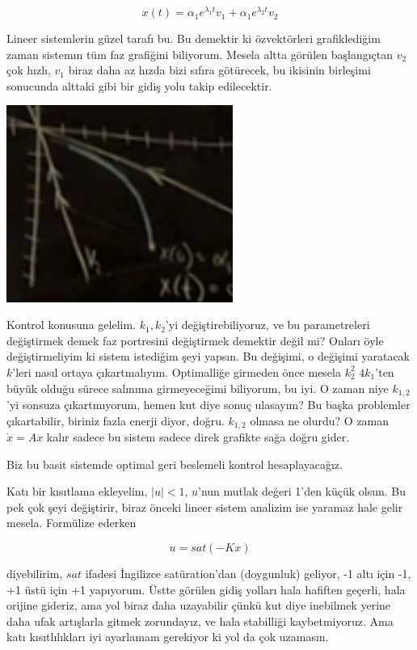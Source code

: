 \documentclass[12pt,fleqn]{article}\usepackage{../../common}
\begin{document}
$$ 
x(t) = \alpha_1 e^{\lambda_1 t}v_1  + \alpha_1 e^{\lambda_2 t} v_2
$$

Lineer sistemlerin güzel tarafı bu. Bu demektir ki özvektörleri
grafiklediğim zaman sistemın tüm faz grafiğini biliyorum. Mesela altta
görülen başlangıçtan $v_2$ çok hızlı, $v_1$ biraz daha az hızda bizi sıfıra
götürecek, bu ikisinin birleşimi sonucunda alttaki gibi bir gidiş yolu
takip edilecektir.

\includegraphics[width=20em]{phy_control_03.png}

Kontrol konusuna gelelim. $k_1,k_2$'yi değiştirebiliyoruz, ve bu
parametreleri değiştirmek demek faz portresini değiştirmek demektir değil
mi? Onları öyle değiştirmeliyim ki sistem istediğim şeyi yapsın. Bu
değişimi, o değişimi yaratacak $k$'leri nasıl ortaya
çıkartmalıyım. Optimalliğe girmeden önce mesela $k_2^2$ $4k_1$'ten büyük
olduğu sürece salınıma girmeyeceğimi biliyorum, bu iyi. O zaman niye
$k_{1,2}$'yi sonsuza çıkartmıyorum, hemen kut diye sonuç ulasayım? Bu başka
problemler çıkartabilir, biriniz fazla enerji diyor, doğru. $k_{1,2}$
olmasa ne olurdu? O zaman $\dot{x} = Ax$ kalır sadece bu sistem sadece
direk grafikte sağa doğru gider. 

Biz bu basit sistemde optimal geri beslemeli kontrol hesaplayacağız. 

Katı bir kısıtlama ekleyelim, $|u| < 1$, $u$'nun mutlak değeri 1'den küçük
olsun. Bu pek çok şeyi değiştirir, biraz önceki lineer sistem analizim ise
yaramaz hale gelir mesela. Formülize ederken 

$$ 
u = sat(-Kx)
$$

diyebilirim, $sat$ ifadesi İngilizce satüration'dan (doygunluk) geliyor, -1
altı için -1, +1 üstü için +1 yapıyorum. Üstte görülen gidiş yolları hala
hafiften geçerli, hala orijine gideriz, ama yol biraz daha uzayabilir çünkü
kut diye inebilmek yerine daha ufak artışlarla gitmek zorundayız, ve hala
stabilliği kaybetmiyoruz. Ama katı kısıtlılıkları iyi ayarlamam gerekiyor
ki yol da çok uzamasın. 
\end{document}
